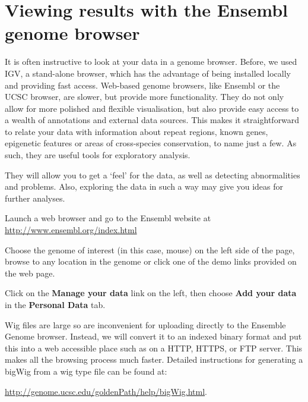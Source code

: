 \section{Viewing results with the Ensembl genome browser}

\begin{information}
It is often instructive to look at your data in a genome browser. Before, we
used IGV, a stand-alone browser, which has the advantage of being installed
locally and providing fast access. Web-based genome browsers, like Ensembl or
the UCSC browser, are slower, but provide more functionality. They do not only
allow for more polished and flexible visualisation, but also provide easy access
to a wealth of annotations and external data sources. This makes it
straightforward to relate your data with information about repeat regions, known
genes, epigenetic features or areas of cross-species conservation, to name just
a few. As such, they are useful tools for exploratory analysis.

They will allow you to get a `feel' for the data, as well as detecting
abnormalities and problems. Also, exploring the data in such a way may give you
ideas for further analyses.
\end{information}

\begin{steps}
Launch a web browser and go to the Ensembl website at
\url{http://www.ensembl.org/index.html}

Choose the genome of interest (in this case, mouse) on the left side of the
page, browse to any location in the genome or click one of the demo links
provided on the web page.

Click on the \textbf{Manage your data} link on the left, then choose
\textbf{Add your data} in the \textbf{Personal Data} tab.

\end{steps}

\begin{note}
Wig files are large so are inconvenient for uploading directly to the Ensemble Genome browser. Instead, we will convert it to an indexed binary format
and put this into a web accessible place such as on a HTTP, HTTPS, or FTP server.
This makes all the browsing process much faster. Detailed
instructions for generating a bigWig from a wig type file can be found at:

\url{http://genome.ucsc.edu/goldenPath/help/bigWig.html}.

\end{note}

